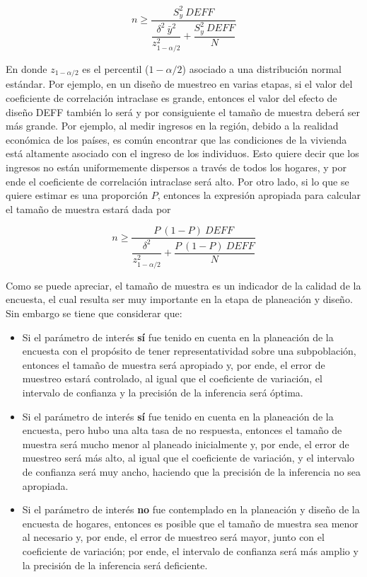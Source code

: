 \documentclass[
  12pt,
  spanish,
]{book}
\providecommand{\tightlist}{%
  \setlength{\itemsep}{0pt}\setlength{\parskip}{0pt}}
\begin{document}
\[ 
n \geq \dfrac{S^2_{y}\ DEFF}{\dfrac{\delta^2 \  \bar{y}^2}{z_{1-\alpha/2}^2}+\dfrac{S^2_{y}\ DEFF}{N}}
\]

En donde \(z_{1-\alpha/2}\) es el percentil (\(1- \alpha/2\)) asociado a una distribución normal estándar. Por ejemplo, en un diseño de muestreo en varias etapas, si el valor del coeficiente de correlación intraclase es grande, entonces el valor del efecto de diseño DEFF también lo será y por consiguiente el tamaño de muestra deberá ser más grande. Por ejemplo, al medir ingresos en la región, debido a la realidad económica de los países, es común encontrar que las condiciones de la vivienda está altamente asociado con el ingreso de los individuos. Esto quiere decir que los ingresos no están uniformemente dispersos a través de todos los hogares, y por ende el coeficiente de correlación intraclase será alto. Por otro lado, si lo que se quiere estimar es una proporción \(P\), entonces la expresión apropiada para calcular el tamaño de muestra estará dada por

\[ 
n \geq \dfrac{P\ (1-P)\ DEFF}{\dfrac{\delta^2}{z_{1-\alpha/2}^2 }+\dfrac{P\ (1-P) \ DEFF}{N}}
\]

Como se puede apreciar, el tamaño de muestra es un indicador de la calidad de la encuesta, el cual resulta ser muy importante en la etapa de planeación y diseño. Sin embargo se tiene que considerar que:

\begin{itemize}
\tightlist
\item
  Si el parámetro de interés \textbf{sí} fue tenido en cuenta en la planeación de la encuesta con el propósito de tener representatividad sobre una subpoblación, entonces el tamaño de muestra será apropiado y, por ende, el error de muestreo estará controlado, al igual que el coeficiente de variación, el intervalo de confianza y la precisión de la inferencia será óptima.
\item
  Si el parámetro de interés \textbf{sí} fue tenido en cuenta en la planeación de la encuesta, pero hubo una alta tasa de no respuesta, entonces el tamaño de muestra será mucho menor al planeado inicialmente y, por ende, el error de muestreo será más alto, al igual que el coeficiente de variación, y el intervalo de confianza será muy ancho, haciendo que la precisión de la inferencia no sea apropiada.
\item
  Si el parámetro de interés \textbf{no} fue contemplado en la planeación y diseño de la encuesta de hogares, entonces es posible que el tamaño de muestra sea menor al necesario y, por ende, el error de muestreo será mayor, junto con el coeficiente de variación; por ende, el intervalo de confianza será más amplio y la precisión de la inferencia será deficiente.
\end{itemize}
\end{document}
